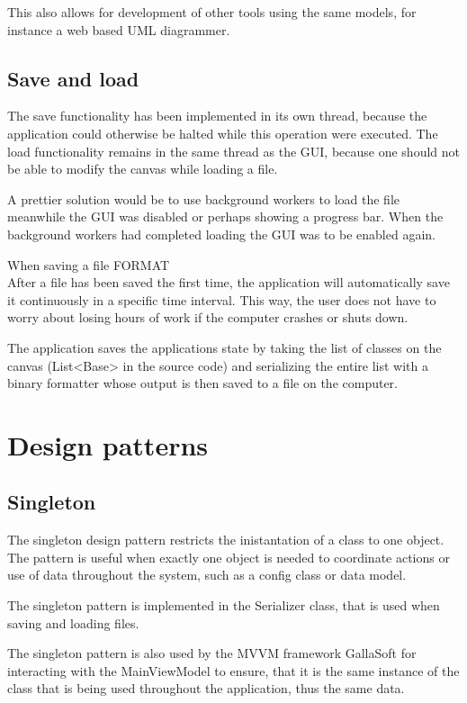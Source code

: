This also allows for development of other tools using the same models, for instance a web based UML diagrammer.

\subsection{Save and load}
The save functionality has been implemented in its own thread, because the application could otherwise be halted while this operation were executed. The load functionality remains in the same thread as the GUI, because one should not be able to modify the canvas while loading a file.

A prettier solution would be to use background workers to load the file meanwhile the GUI was disabled or perhaps showing a progress bar. When the background workers had completed loading the GUI was to be enabled again.

When saving a file FORMAT\\

After a file has been saved the first time, the application will automatically save it continuously in a specific time interval. This way, the user does not have to worry about losing hours of work if the computer crashes or shuts down.

The application saves the applications state by taking the list of classes on the canvas (\textsf{List<Base>} in the source code) and serializing the entire list with a binary formatter whose output is then saved to a file on the computer.

\section{Design patterns}
\label{sec:design_pattern}
\subsection{Singleton}
The singleton design pattern restricts the inistantation of a class to one object.
The pattern is useful when exactly one object is needed to coordinate actions or use of data throughout the system, such as a config class or data model.

The singleton pattern is implemented in the \textsf{Serializer} class, that is used when saving and loading files. 

The singleton pattern is also used by the MVVM framework GallaSoft for interacting with the \textsf{MainViewModel} to ensure, that it is the same instance of the class that is being used throughout the application, thus the same data.

